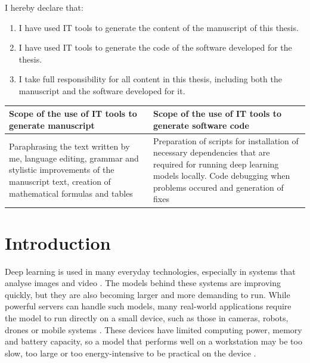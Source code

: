 \documentclass[a4paper,11pt,twoside]{report}
\theoremstyle{definition}
\begin{document}
I hereby declare that:
\begin{enumerate}
    \item I have used IT tools to generate the content of the manuscript of this thesis.
    \item I have used IT tools to generate the code of the software developed for the thesis.
    \item I take full responsibility for all content in this thesis, including both the manuscript and the software developed for it.
\end{enumerate}

\vspace{6pt}

\begin{table}[h]
\centering
\begin{tabular}{|p{}|p{}|}
\hline
\textbf{Scope of the use of IT tools to generate manuscript} &
\textbf{Scope of the use of IT tools to generate software code} \\ \hline
Paraphrasing the text written by me, language editing, grammar and stylistic improvements of the manuscript text, creation of mathematical formulas and tables &
Preparation of scripts for installation of necessary dependencies that are required for running deep learning models locally. Code debugging when problems occured and generation of fixes\\ \hline
\end{tabular}
\end{table}
%
\null\thispagestyle{empty}\newpage
\tableofcontents
\thispagestyle{empty}



\null\thispagestyle{empty}\newpage
\pagestyle{fancy}
\setcounter{page}{11}


\chapter{Introduction}
\label{ch:introduction}

Deep learning is used in many everyday technologies, especially in systems that analyse images and video \cite{LeCun2015DeepLearning}. The models behind these systems are improving quickly, but they are also becoming larger and more demanding to run. While powerful servers can handle such models, many real-world applications require the model to run directly on a small device, such as those in cameras, robots, drones or mobile systems \cite{Howard2017MobileNets}. These devices have limited computing power, memory and battery capacity, so a model that performs well on a workstation may be too slow, too large or too energy-intensive to be practical on the device \cite{Sze2017EfficientProcessing}.
\end{document}
